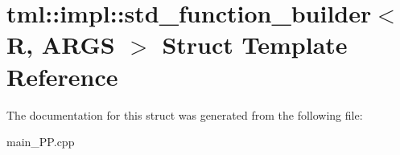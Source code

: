 \hypertarget{structtml_1_1impl_1_1std__function__builder}{\section{tml\+:\+:impl\+:\+:std\+\_\+function\+\_\+builder$<$ R, A\+R\+G\+S $>$ Struct Template Reference}
\label{structtml_1_1impl_1_1std__function__builder}
}


The documentation for this struct was generated from the following file\+:\begin{DoxyCompactItemize}
\item 
main\+\_\+\+P\+P.\+cpp\end{DoxyCompactItemize}
